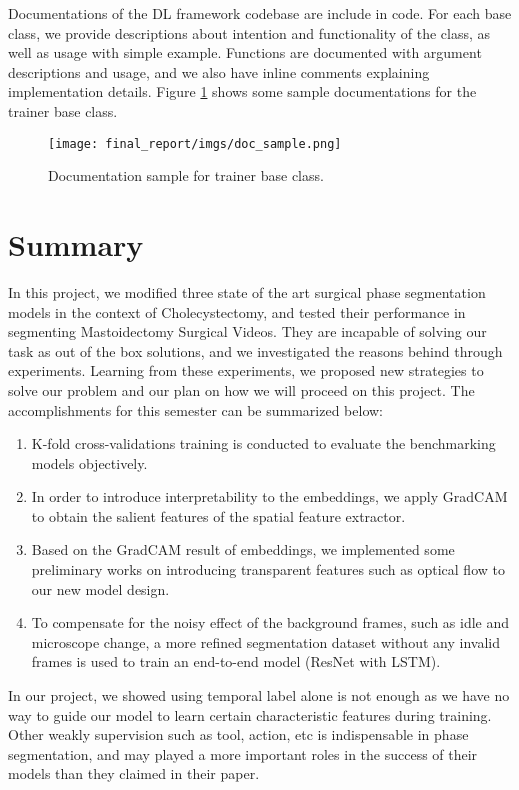 \documentclass[11pt]{article} \usepackage[top=1in, bottom=1in, left=1in, right=1in]{geometry}
\begin{document}
\vspace{0.25cm}
\noindent
Documentations of the DL framework codebase are include in code. For each base class, we provide descriptions about intention and functionality of the class, as well as usage with simple example. Functions are documented with argument descriptions and usage, and we also have inline comments explaining implementation details. Figure \ref{fig:doc_sample} shows some sample documentations for the trainer base class.
\begin{figure}[H]
  \texttt{[image: final\_report/imgs/doc\_sample.png]}
  \centering
  \caption{Documentation sample for trainer base class.}
  \label{fig:doc_sample}
\end{figure}

\section{Summary}

In this project, we modified three state of the art surgical phase segmentation models in the context of Cholecystectomy, and tested their performance in segmenting Mastoidectomy Surgical Videos. They are incapable of solving our task as out of the box solutions, and we investigated the reasons behind through experiments. Learning from these experiments, we proposed new strategies to solve our problem and our plan on how we will proceed on this project. The accomplishments for this semester can be summarized below:
\begin{enumerate}
    \item K-fold cross-validations training is conducted to evaluate the benchmarking models objectively. 
    \item In order to introduce interpretability to the embeddings, we apply GradCAM\cite{gradcam} to obtain the salient features of the spatial feature extractor.
    \item Based on the GradCAM result of embeddings, we implemented some preliminary works on introducing transparent features such as optical flow to our new model design.
    \item To compensate for the noisy effect of the background frames, such as idle and microscope change,  a more refined segmentation dataset without any invalid frames is used to train an end-to-end model (ResNet with LSTM).
\end{enumerate}
In our project, we showed using temporal label alone is not enough as we have no way to guide our model to learn certain characteristic features during training. Other weakly supervision such as tool, action, etc is indispensable in phase segmentation, and may played a more important roles in the success of their models than they claimed in their paper\cite{EndoNet}\cite{TransSVNet}\cite{TeCNO}\cite{lstm}.
\end{document}
